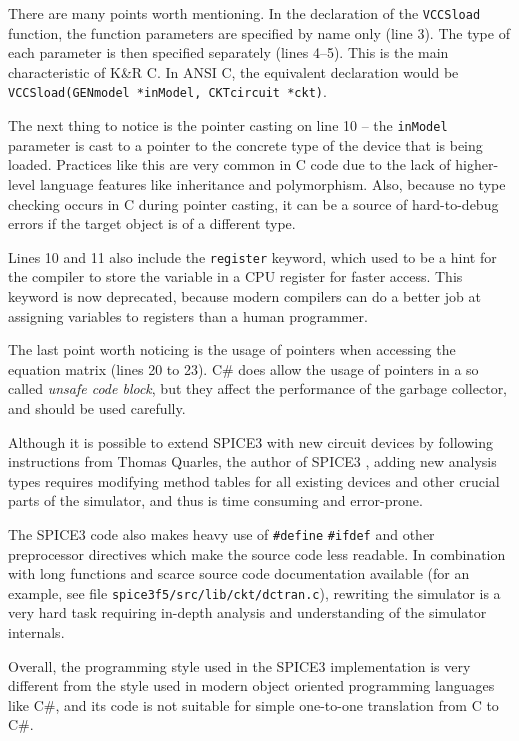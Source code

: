 There are many points worth mentioning. In the declaration of the \texttt{VCCSload} function, the function parameters are specified by name only (line 3). The type of each parameter is then specified separately (lines 4--5). This is the main characteristic of K\&R C. In ANSI C, the equivalent declaration would be \texttt{VCCSload(GENmodel *inModel, CKTcircuit *ckt)}.

The next thing to notice is the pointer casting on line 10 -- the \texttt{inModel} parameter is cast to a pointer to the concrete type of the device that is being loaded. Practices like this are very common in C code due to the lack of higher-level language features like inheritance and polymorphism. Also, because no type checking occurs in C during pointer casting, it can be a source of hard-to-debug errors if the target object is of a different type.

Lines 10 and 11 also include the \texttt{register} keyword, which used to be a hint for the compiler to store the variable in a CPU register for faster access. This keyword is now deprecated, because modern compilers can do a better job at assigning variables to registers than a human programmer.

The last point worth noticing is the usage of pointers when accessing the equation matrix (lines 20 to 23). C\# does allow the usage of pointers in a so called \textit{unsafe code block}, but they affect the performance of the garbage collector, and should be used carefully.

Although it is possible to extend SPICE3 with new circuit devices by following instructions from Thomas Quarles, the author of SPICE3 \cite{Quarles:M89/45}, adding new analysis types requires modifying method tables for all existing devices and other crucial parts of the simulator, and thus is time consuming and error-prone.

The SPICE3 code also makes heavy use of \texttt{\#define} \texttt{\#ifdef} and other preprocessor directives which make the source code less readable. In combination with long functions and scarce source code documentation available (for an example, see file \texttt{spice3f5/src/lib/ckt/dctran.c}), rewriting the simulator is a very hard task requiring in-depth analysis and understanding of the simulator internals.

Overall, the programming style used in the SPICE3 implementation is very different from the style used in modern object oriented programming languages like C\#, and its code is not suitable for simple one-to-one translation from C to C\#.

